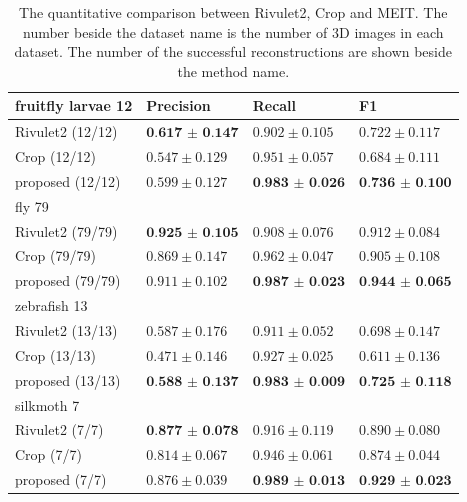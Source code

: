 \documentclass[conference]{IEEEtran}
\begin{document}
\begin{table}[htbp]
\caption{The quantitative comparison between Rivulet2, Crop and MEIT. The number beside the dataset name is the number of 3D images in each dataset. The number of the successful reconstructions are shown beside the method name.}
\begin{center}
\begin{tabular}{|l|l|l|l|}
\hline
fruitfly larvae 12& Precision         & Recall             & F1      \\
\hline
Rivulet2 (12/12)    & $\textbf{0.617}$ $\boldsymbol{\pm}$ $\textbf{0.147}$   & $0.902\pm0.105$  & $0.722\pm0.117$\\
Crop (12/12) & $0.547\pm0.129$   & $0.951\pm0.057$  &  $0.684\pm0.111$\\
proposed (12/12) & $0.599\pm0.127$   & $\textbf{0.983}$ $\boldsymbol{\pm}$ $\textbf{0.026}$  &  $\textbf{0.736}$ $\boldsymbol{\pm}$ $\textbf{0.100}$\\ 
\hline
fly 79 &\multicolumn{3}{l|}{}\\
\hline
Rivulet2 (79/79)    & $\textbf{0.925}$ $\boldsymbol{\pm}$ $\textbf{0.105}$   & $0.908\pm0.076$  & $0.912\pm0.084$\\
Crop (79/79) & $0.869\pm0.147$   & $0.962\pm0.047$  &  $0.905\pm0.108$\\
proposed (79/79) & $0.911\pm0.102$   & $\textbf{0.987}$ $\boldsymbol{\pm}$ $\textbf{0.023}$  &  $\textbf{0.944}$ $\boldsymbol{\pm}$ $\textbf{0.065}$\\
\hline
zebrafish 13 &\multicolumn{3}{l|}{}\\
\hline
Rivulet2 (13/13)    & $0.587\pm0.176$   & $0.911\pm0.052$  & $0.698\pm0.147$\\
Crop (13/13) & $0.471\pm0.146$   & $0.927\pm0.025$  &  $0.611\pm0.136$\\
proposed (13/13) & $\textbf{0.588}$ $\boldsymbol{\pm}$ $\textbf{0.137}$   & $\textbf{0.983}$ $\boldsymbol{\pm}$ $\textbf{0.009}$  & $\textbf{0.725}$ $\boldsymbol{\pm}$ $\textbf{0.118}$\\ 
\hline
silkmoth 7 &\multicolumn{3}{l|}{}\\
\hline
Rivulet2 (7/7)    & $\textbf{0.877}$ $\boldsymbol{\pm}$ $\textbf{0.078}$   & $0.916\pm0.119$  & $0.890\pm0.080$\\
Crop (7/7) & $0.814\pm0.067$   & $0.946\pm0.061$  &  $0.874\pm0.044$\\
proposed (7/7) & $0.876\pm0.039$   & $\textbf{0.989}$ $\boldsymbol{\pm}$ $\textbf{0.013}$  &  $\textbf{0.929}$ $\boldsymbol{\pm}$ $\textbf{0.023}$\\ 

\end{tabular}
\end{center}
\end{table}
\end{document}
